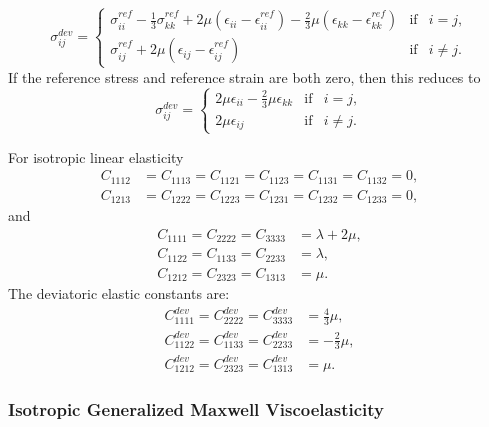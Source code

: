 \begin{equation}
  \boxed{
  \sigma_{ij}^\mathit{dev} = \left\{ \begin{array}{lcr}
      \sigma_{ii}^\mathit{ref} -\frac{1}{3}\sigma_{kk}^\mathit{ref} + 2\mu\left(\epsilon_{ii}-
\epsilon_{ii}
^\mathit{ref}\right) - \frac{2}{3}\mu\left(\epsilon_{kk}-\epsilon_{kk}^\mathit{ref}\right) & 
\text{if} & i = j, \\
      \sigma_{ij}^\mathit{ref} + 2\mu\left(\epsilon_{ij}-\epsilon_{ij}^\mathit{ref}\right) & 
\text{if} & i \neq j.
    \end{array} \right.
}%
\end{equation}
If the reference stress and reference strain are both zero, then this reduces to
\begin{equation}
  \boxed{
  \sigma_{ij}^\mathit{dev} = \left\{ \begin{array}{lcr}
      2\mu\epsilon_{ii} - \frac{2}{3}\mu\epsilon_{kk} & \text{if} & i = j, \\
      2\mu\epsilon_{ij} & \text{if} & i \neq j.
    \end{array} \right.
  }%
\end{equation}

For isotropic linear elasticity
\begin{align}
  C_{1112} &= C_{1113} = C_{1121} = C_{1123} = C_{1131} = C_{1132} = 0,\\
  C_{1213} &= C_{1222} = C_{1223} = C_{1231} = C_{1232} = C_{1233} = 0,
\end{align}
and
\begin{align}
  C_{1111} = C_{2222} = C_{3333} &= \lambda + 2 \mu, \\
  C_{1122} = C_{1133} = C_{2233} &= \lambda, \\
  C_{1212} = C_{2323} = C_{1313} &= \mu.
\end{align}
The deviatoric elastic constants are:
\begin{align}
  C^\mathit{dev}_{1111} = C^\mathit{dev}_{2222} = C^\mathit{dev}_{3333} &= \frac{4}{3}\mu, \\
  C^\mathit{dev}_{1122} = C^\mathit{dev}_{1133} = C^\mathit{dev}_{2233} &= -\frac{2}{3}\mu, \\
  C^\mathit{dev}_{1212} = C^\mathit{dev}_{2323} = C^\mathit{dev}_{1313} &= \mu.
\end{align}

\subsubsection{Isotropic Generalized Maxwell Viscoelasticity}

